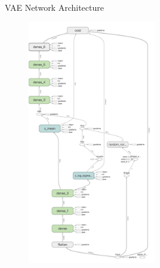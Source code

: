 \documentclass[11pt]{beamer} %
\begin{document}
\begin{frame}{VAE Network Architecture}
\begin{figure}[htbp]
\centering
\includegraphics[width=0.5\textwidth,angle=-90,origin=c]{img/vae1.png}
\end{figure}
\end{frame}
\end{document}
